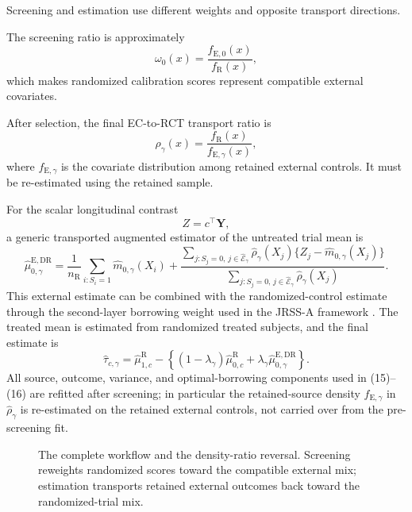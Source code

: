 \documentclass[11pt]{article}
\newcommand{\R}{\mathrm{R}}
\newcommand{\E}{\mathrm{E}}
\newcommand{\fullfig}[1]{\resizebox{\linewidth}{!}{}}
\begin{document}
Screening and estimation use different weights and opposite transport directions.

The screening ratio is approximately
\[
\omega_0(x)=\frac{f_{\E,0}(x)}{f_{\R}(x)},
\]
which makes randomized calibration scores represent compatible external covariates.

After selection, the final EC-to-RCT transport ratio is
\[
\rho_{\gamma}(x)
=
\frac{f_{\R}(x)}{f_{\E,\gamma}(x)},
\]
where $f_{\E,\gamma}$ is the covariate distribution among retained external controls. It must be re-estimated using the retained sample.

For the scalar longitudinal contrast
\[
Z=c^{\top}\bm Y,
\]
a generic transported augmented estimator of the untreated trial mean is
\[
\widehat\mu_{0,\gamma}^{\E,\mathrm{DR}}
=
\frac{1}{n_{\R}}\sum_{i:S_i=1}\widehat m_{0,\gamma}(X_i)
+
\frac{
\sum_{j:S_j=0,\,j\in\widehat{\mathcal E}_{\gamma}}
\widehat\rho_{\gamma}(X_j)
\{Z_j-\widehat m_{0,\gamma}(X_j)\}
}
{
\sum_{j:S_j=0,\,j\in\widehat{\mathcal E}_{\gamma}}
\widehat\rho_{\gamma}(X_j)
}.
\tag{15}
\]
This external estimate can be combined with the randomized-control estimate through the second-layer borrowing weight used in the JRSS-A framework \citep{zhou2025causal}. The treated mean is estimated from randomized treated subjects, and the final estimate is
\[
\widehat\tau_{c,\gamma}
=
\widehat\mu_{1,c}^{\R}
-
\left\{(1-\lambda_\gamma)\widehat\mu_{0,c}^{\R}
+\lambda_\gamma\widehat\mu_{0,\gamma}^{\E,\mathrm{DR}}\right\}.
\tag{16}
\]
All source, outcome, variance, and optimal-borrowing components used in (15)--(16) are refitted after screening; in particular the retained-source density $f_{\E,\gamma}$ in $\widehat\rho_\gamma$ is re-estimated on the retained external controls, not carried over from the pre-screening fit.

\begin{figure}[!ht]
\centering
\fullfig{screen_refit_workflow.tex}
\caption{The complete workflow and the density-ratio reversal. Screening reweights randomized scores toward the compatible external mix; estimation transports retained external outcomes back toward the randomized-trial mix.}
\label{fig:screen-refit}
\end{figure}
\end{document}
